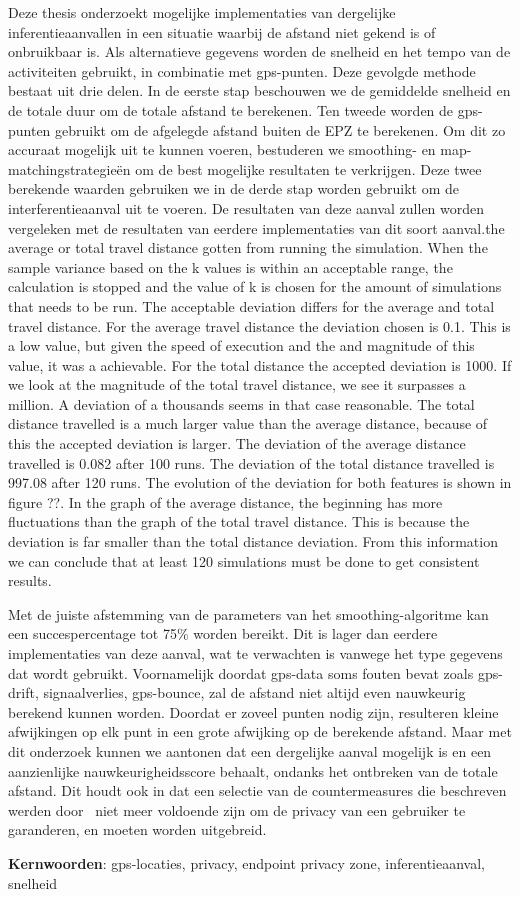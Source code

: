 Deze thesis onderzoekt mogelijke implementaties van dergelijke
inferentieaanvallen in een situatie waarbij de afstand niet gekend is of
onbruikbaar is. Als alternatieve gegevens worden de snelheid en het tempo van
de activiteiten gebruikt, in combinatie met gps-punten. Deze gevolgde methode
bestaat uit drie delen. In de eerste stap beschouwen we de gemiddelde snelheid
en de totale duur om de totale afstand te berekenen. Ten tweede worden de
gps-punten gebruikt om de afgelegde afstand buiten de EPZ te berekenen. Om dit
zo accuraat mogelijk uit te kunnen voeren, bestuderen we smoothing- en
map-matchingstrategieën om de best mogelijke resultaten te verkrijgen. Deze
twee berekende waarden gebruiken we in de derde stap worden gebruikt om de
interferentieaanval uit te voeren. De resultaten van deze aanval zullen worden
vergeleken met de resultaten van eerdere implementaties van dit soort
aanval.the average or total travel distance gotten from running the simulation.
When the sample variance based on the k values is within an acceptable range,
the calculation is stopped and the value of k is chosen for the amount of
simulations that needs to be run. The acceptable deviation differs for the
average and total travel distance. For the average travel distance the
deviation chosen is 0.1. This is a low value, but given the speed of execution
and the and magnitude of this value, it was a achievable. For the total
distance the accepted deviation is 1000. If we look at the magnitude of the
total travel distance, we see it surpasses a million. A deviation of a
thousands seems in that case reasonable. The total distance travelled is a much
larger value than the average distance, because of this the accepted deviation
is larger. The deviation of the average distance travelled is 0.082 after 100
runs. The deviation of the total distance travelled is 997.08 after 120 runs.
The evolution of the deviation for both features is shown in figure ??. In the
graph of the average distance, the beginning has more fluctuations than the
graph of the total travel distance. This is because the deviation is far
smaller than the total distance deviation. From this information we can
conclude that at least 120 simulations must be done to get consistent results.

Met de juiste afstemming van de parameters van het smoothing-algoritme kan een
succespercentage tot 75\% worden bereikt. Dit is lager dan eerdere
implementaties van deze aanval, wat te verwachten is vanwege het type gegevens
dat wordt gebruikt. Voornamelijk doordat gps-data soms fouten bevat zoals
gps-drift, signaalverlies, gps-bounce, zal de afstand niet altijd even
nauwkeurig berekend kunnen worden. Doordat er zoveel punten nodig zijn,
resulteren kleine afwijkingen op elk punt in een grote afwijking op de
berekende afstand. Maar met dit onderzoek kunnen we aantonen dat een dergelijke
aanval mogelijk is en een aanzienlijke nauwkeurigheidsscore behaalt, ondanks
het ontbreken van de totale afstand. Dit houdt ook in dat een selectie van de
countermeasures die beschreven werden door~\citeauthor{Dhondt} niet meer
voldoende zijn om de privacy van een gebruiker te garanderen, en moeten worden
uitgebreid.

\textbf{Kernwoorden}: gps-locaties, privacy, endpoint privacy zone,
inferentieaanval, snelheid
